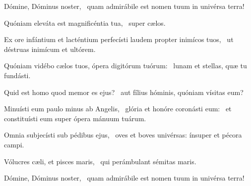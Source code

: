 \item Dómine, Dóminus noster,~\psstar{} quam admirábile est nomen tuum in univérsa terra!

\item Quóniam eleváta est magnificéntia tua,~\psstar{} super cælos.

\item Ex ore infántium et lacténtium perfecísti laudem propter inimícos tuos,~\psstar{} ut déstruas inimícum et ultórem.

\item Quóniam vidébo cælos tuos, ópera digitórum tuórum:~\psstar{} lunam et stellas, quæ tu fundásti.

\item Quid est homo quod memor es ejus?~\psstar{} aut fílius hóminis, quóniam vísitas eum?

\item Minuísti eum paulo minus ab Angelis,~\pscross{} glória et honóre coronásti eum:~\psstar{} et constituísti eum super ópera mánuum tuárum.

\item Omnia subjecísti sub pédibus ejus,~\psstar{} oves et boves univérsas: ínsuper et pécora campi.

\item Vólucres cæli, et pisces maris,~\psstar{} qui perámbulant sémitas maris.

\item Dómine, Dóminus noster,~\psstar{} quam admirábile est nomen tuum in univérsa terra!
